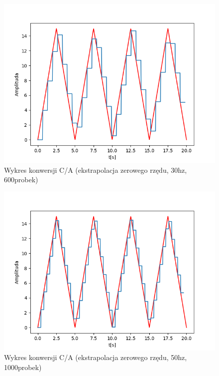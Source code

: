 \documentclass[12pt]{article}
\begin{document}
\begin{figure}[H]
\centering
\includegraphics[scale=0.6]{77trojkatekstr0rzedu30.png}
\caption{Wykres konwersji C/A (ekstrapolacja zerowego rzędu, 30hz, 600probek)}
\end{figure}

\begin{figure}[H]
\centering
\includegraphics[scale=0.6]{77trojkatekstr0rzedu50.png}
\caption{Wykres konwersji C/A (ekstrapolacja zerowego rzędu, 50hz, 1000probek)}
\end{figure}
\end{document}
